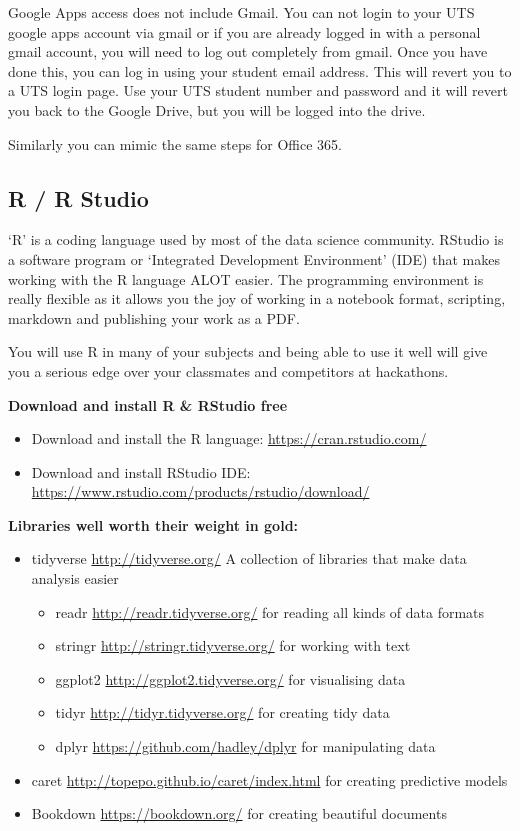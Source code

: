 \documentclass[]{book}
\providecommand{\tightlist}{%
  \setlength{\itemsep}{0pt}\setlength{\parskip}{0pt}}
\theoremstyle{definition}
\theoremstyle{definition}
\theoremstyle{remark}
\begin{document}
Google Apps access does not include Gmail. You can not login to your UTS
google apps account via gmail or if you are already logged in with a
personal gmail account, you will need to log out completely from gmail.
Once you have done this, you can log in using your student email
address. This will revert you to a UTS login page. Use your UTS student
number and password and it will revert you back to the Google Drive, but
you will be logged into the drive.

Similarly you can mimic the same steps for Office 365.

\subsection{R / R Studio}\label{r-r-studio}

`R' is a coding language used by most of the data science community.
RStudio is a software program or `Integrated Development Environment'
(IDE) that makes working with the R language ALOT easier. The
programming environment is really flexible as it allows you the joy of
working in a notebook format, scripting, markdown and publishing your
work as a PDF.

You will use R in many of your subjects and being able to use it well
will give you a serious edge over your classmates and competitors at
hackathons.

\textbf{Download and install R \& RStudio free}

\begin{itemize}
\tightlist
\item
  Download and install the R language: \url{https://cran.rstudio.com/}
\item
  Download and install RStudio IDE:
  \url{https://www.rstudio.com/products/rstudio/download/}
\end{itemize}

\textbf{Libraries well worth their weight in gold:}

\begin{itemize}
\tightlist
\item
  tidyverse \url{http://tidyverse.org/} A collection of libraries that
  make data analysis easier

  \begin{itemize}
  \tightlist
  \item
    readr \url{http://readr.tidyverse.org/} for reading all kinds of
    data formats
  \item
    stringr \url{http://stringr.tidyverse.org/} for working with text
  \item
    ggplot2 \url{http://ggplot2.tidyverse.org/} for visualising data
  \item
    tidyr \url{http://tidyr.tidyverse.org/} for creating tidy data
  \item
    dplyr \url{https://github.com/hadley/dplyr} for manipulating data
  \end{itemize}
\item
  caret \url{http://topepo.github.io/caret/index.html} for creating
  predictive models
\item
  Bookdown \url{https://bookdown.org/} for creating beautiful documents
\end{itemize}
\end{document}
